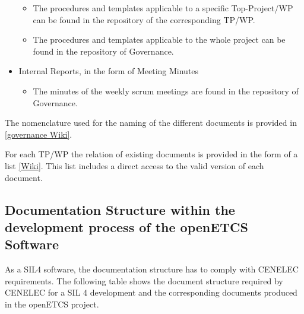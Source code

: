 \documentclass{template/openetcs_article}
\begin{document}
\begin{itemize}
\begin{itemize}
\item The procedures and templates applicable to a specific Top-Project/\gls{WP} can be found in the repository of the corresponding TP/\gls{WP}.
\item The procedures and templates applicable to the whole project can be found in the repository of Governance.
\end{itemize}
\item Internal Reports, in the form of Meeting Minutes
\begin{itemize}
\item The minutes of the weekly scrum meetings are found in the repository of Governance.
\end{itemize}
\end{itemize}

The nomenclature used for the naming of the different documents is provided in \href{https://github.com/openETCS/governance/wiki/Nomenclature-Guideline}{[governance Wiki]}.

For each TP/\gls{WP} the relation of existing documents is provided in the form of a list \href{https://github.com/openETCS/governance/wiki}{[Wiki]}. This list includes a direct access to the valid version of each document.

\subsection{Documentation Structure within the development process of the openETCS Software}
As a \gls{SIL}4 software, the documentation structure has to comply with CENELEC requirements. The following table shows the document structure required by CENELEC for a \gls{SIL} 4 development and the corresponding documents produced in the openETCS project.
\end{document}
